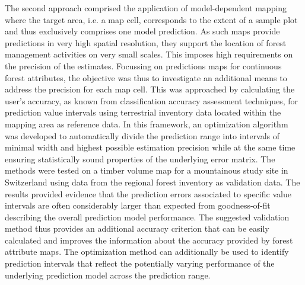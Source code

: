 The second approach comprised the application of model-dependent mapping where the target area, i.e. a map cell, corresponds to the extent of a sample plot and thus exclusively comprises one model prediction.
As such maps provide predictions in very high spatial resolution, they support the location of forest management activities on very small scales. This imposes high requirements on the precision of the estimates. Focussing on predictions maps for continuous forest attributes, the objective was thus to investigate an additional means to address the precision for each map cell. This was approached by calculating the user's accuracy, as known from classification accuracy assessment techniques, for prediction value intervals using terrestrial inventory data located within the mapping area as reference data. In this framework, an optimization algorithm was developed to automatically divide the prediction range into intervals of minimal width and highest possible estimation precision while at the same time ensuring statistically sound properties of the underlying error matrix. The methods were tested on a timber volume map for a mountainous study site in Switzerland using data from the regional forest inventory as validation data. The results provided evidence that the prediction errors associated to specific value intervals are often considerably larger than expected from goodness-of-fit describing the overall prediction model performance. The suggested validation method thus provides an additional accuracy criterion that can be easily calculated and improves the information about the accuracy provided by forest attribute maps. The optimization method can additionally be used to identify prediction intervals that reflect the potentially varying performance of the underlying prediction model across the prediction range.